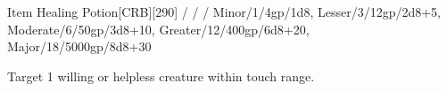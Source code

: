 

\begin{card-collection}{Item}{\tlevel}{\type{} Healing Potion}[CRB][290]{
  \type / \tlevel / \price / \hitPoints
}{
  Minor/1/4gp/1d8,
  Lesser/3/12gp/2d8+5,
  Moderate/6/50gp/3d8+10,
  Greater/12/400gp/6d8+20,
  Major/18/5000gp/8d8+30
}




\HealingRoll{\hitPoints}{}


Target 1 willing or helpless creature within touch range.

\HealingRoll{\hitPoints}{}

\ItemPrice{\price}
\end{card-collection}